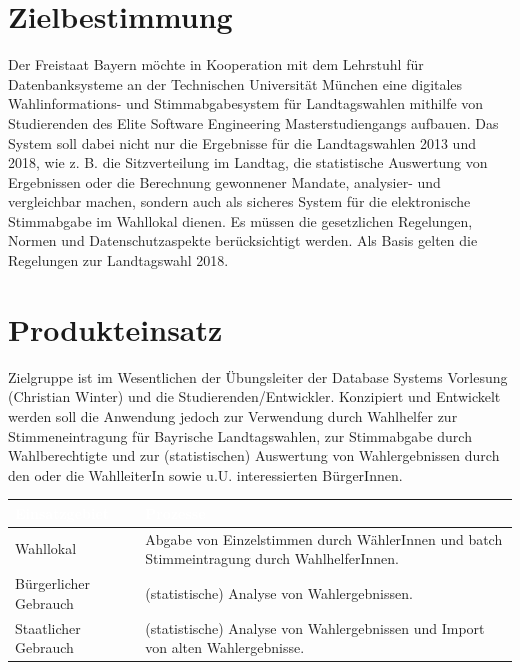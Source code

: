 \documentclass[a4paper,12pt]{article}
\begin{document}
 \setcounter{page}{2}
 \tableofcontents          %
 \clearpage
 
\section{Zielbestimmung}
Der Freistaat Bayern möchte in Kooperation mit dem Lehrstuhl für 
Datenbanksysteme an der Technischen Universität München eine digitales 
Wahlinformations- und Stimmabgabesystem für Landtagswahlen mithilfe von 
Studierenden des Elite Software Engineering Masterstudiengangs aufbauen.
%
Das System soll dabei nicht nur die Ergebnisse für die Landtagswahlen 
2013 und 2018, wie z. B. die Sitzverteilung im Landtag, die statistische Auswertung von Ergebnissen oder die Berechnung gewonnener
Mandate, analysier- und vergleichbar machen, sondern auch als sicheres System für die elektronische 
Stimmabgabe im Wahllokal dienen. 
%
Es müssen die gesetzlichen Regelungen, Normen und Datenschutzaspekte
berücksichtigt werden. Als Basis gelten die Regelungen zur
Landtagswahl 2018.

\section{Produkteinsatz}
Zielgruppe ist im Wesentlichen der Übungsleiter der Database Systems 
Vorlesung (Christian Winter) und die Studierenden/Entwickler. 
%
Konzipiert und Entwickelt werden soll die Anwendung jedoch zur Verwendung 
durch Wahlhelfer zur Stimmeneintragung für Bayrische Landtagswahlen, 
zur Stimmabgabe durch Wahlberechtigte und zur (statistischen) Auswertung
von Wahlergebnissen durch den oder die WahlleiterIn sowie u.U. 
interessierten BürgerInnen.

\begin{center}
\begin{tabular}{|m{5cm}|m{10cm}|}
	\hline
  \rowcolor{TUMBlue} \textcolor{white}{\textbf{Einsatzgebiet}} & \textcolor{white}{\textbf{Prozesse}} \\
  \hline
  Wahllokal & Abgabe von Einzelstimmen durch WählerInnen und batch Stimmeintragung durch WahlhelferInnen. \\
	\hline
  Bürgerlicher Gebrauch & (statistische) Analyse von Wahlergebnissen. \\
  \hline
  Staatlicher Gebrauch & (statistische) Analyse von Wahlergebnissen und Import von alten Wahlergebnisse. \\
	\hline
\end{tabular}
\end{center}
\end{document}
